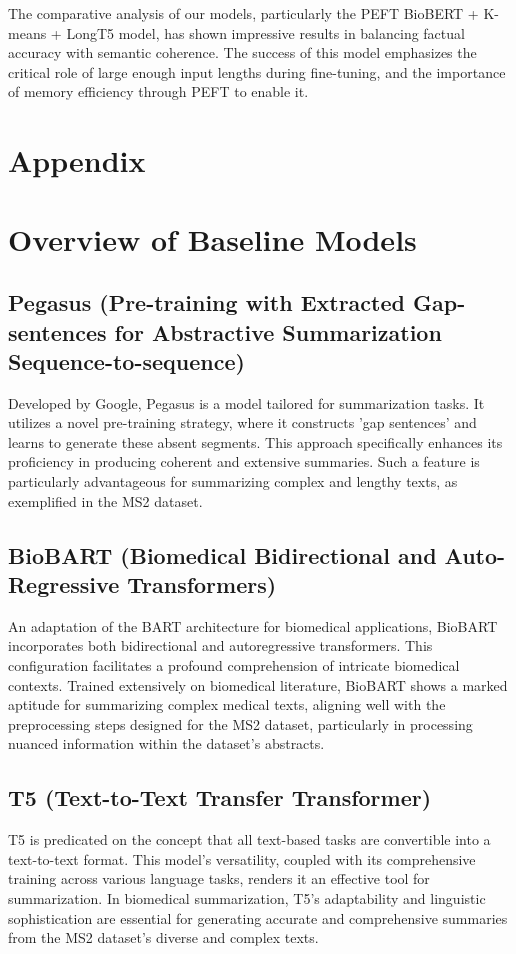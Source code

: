 \documentclass[11pt]{article}
\begin{document}
The comparative analysis of our models, particularly the PEFT BioBERT + K-means + LongT5 model, has shown impressive results in balancing factual accuracy with semantic coherence. The success of this model emphasizes the critical role of large enough input lengths during fine-tuning, and the importance of memory efficiency through PEFT to enable it.


\section*{Appendix}
\appendix{}

\section{Overview of Baseline Models}
\label{app:baselineoverview}

\subsection*{\textbf{Pegasus} (Pre-training with Extracted Gap-sentences for Abstractive Summarization Sequence-to-sequence)}
Developed by Google, Pegasus is a model tailored for summarization tasks. It utilizes a novel pre-training strategy, where it constructs 'gap sentences' and learns to generate these absent segments. This approach specifically enhances its proficiency in producing coherent and extensive summaries. Such a feature is particularly advantageous for summarizing complex and lengthy texts, as exemplified in the MS2 dataset.

\subsection*{\textbf{BioBART} (Biomedical Bidirectional and Auto-Regressive Transformers)}
An adaptation of the BART architecture for biomedical applications, BioBART incorporates both bidirectional and autoregressive transformers. This configuration facilitates a profound comprehension of intricate biomedical contexts. Trained extensively on biomedical literature, BioBART shows a marked aptitude for summarizing complex medical texts, aligning well with the preprocessing steps designed for the MS2 dataset, particularly in processing nuanced information within the dataset's abstracts.

\subsection*{\textbf{T5} (Text-to-Text Transfer Transformer)}
T5 is predicated on the concept that all text-based tasks are convertible into a text-to-text format. This model's versatility, coupled with its comprehensive training across various language tasks, renders it an effective tool for summarization. In biomedical summarization, T5's adaptability and linguistic sophistication are essential for generating accurate and comprehensive summaries from the MS2 dataset's diverse and complex texts.
\end{document}

